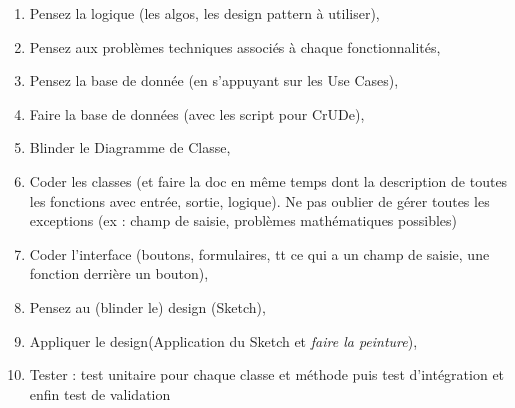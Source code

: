 \documentclass[a4paper,12pt,twoside]{article}
\begin{document}
\begin{enumerate}
 \item Pensez la logique (les algos, les design pattern à utiliser), 
 \item Pensez aux problèmes techniques associés à chaque fonctionnalités,
 \item Pensez la base de donnée (en s'appuyant sur les Use Cases),
 \item Faire la base de données (avec les script pour CrUDe),
 \item Blinder le Diagramme de Classe,
 \item Coder les classes (et faire la doc en même temps dont la description de toutes les fonctions avec entrée, sortie, logique). Ne pas oublier de gérer toutes les exceptions (ex :  champ de saisie, problèmes mathématiques possibles)
 \item Coder l'interface (boutons, formulaires, tt ce qui a un champ de saisie, une fonction derrière un bouton),
 \item Pensez au (blinder le) design (Sketch),
 \item Appliquer le design(Application du Sketch et \textit{faire la peinture}),
 \item Tester : test unitaire pour chaque classe et méthode puis test d'intégration et enfin test de validation
\end{enumerate}

\end{document}
